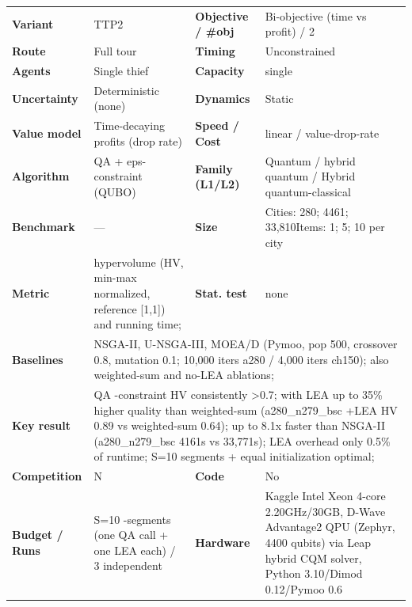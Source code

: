 \documentclass[
  a4paper,
  11pt,
  headings=small,
  numbers=noenddot,
  abstract=on,
  parskip=half,
]{scrartcl}
\begin{document}
\begin{landscape}
\begin{longtable}{@{}p{2.6cm}p{8.7cm}p{2.6cm}p{8.7cm}@{}}
\textbf{Variant} & TTP2 & \textbf{Objective / \#obj} & Bi-objective (time vs profit) / 2 \\
\textbf{Route} & Full tour & \textbf{Timing} & Unconstrained \\
\textbf{Agents} & Single thief & \textbf{Capacity} & single \\
\textbf{Uncertainty} & Deterministic (none) & \textbf{Dynamics} & Static \\
\textbf{Value model} & Time-decaying profits (drop rate) & \textbf{Speed / Cost} & linear / value-drop-rate \\
\textbf{Algorithm} & QA + eps-constraint (QUBO) & \textbf{Family (L1/L2)} & Quantum / hybrid quantum / Hybrid quantum-classical \\
\textbf{Benchmark} & --- & \textbf{Size} & Cities: 280; 4461; 33,810\newline Items: 1; 5; 10 per city \\
\textbf{Metric} & hypervolume (HV, min-max normalized, reference [1,1]) and running time; & \textbf{Stat. test} & none \\
\textbf{Baselines} & \multicolumn{3}{p{20.0cm}}{NSGA-II, U-NSGA-III, MOEA/D (Pymoo, pop 500, crossover 0.8, mutation 0.1; 10,000 iters a280 / 4,000 iters ch150); also weighted-sum and no-LEA ablations;} \\
\textbf{Key result} & \multicolumn{3}{p{20.0cm}}{QA -constraint HV consistently >0.7; with LEA up to 35\% higher quality than weighted-sum (a280\_n279\_bsc +LEA HV 0.89 vs weighted-sum 0.64); up to 8.1x faster than NSGA-II (a280\_n279\_bsc 4161s vs 33,771s); LEA overhead only 0.5\% of runtime; S=10 segments + equal initialization optimal;} \\
\textbf{Competition} & N & \textbf{Code} & No \\
\textbf{Budget / Runs} & S=10 -segments (one QA call + one LEA each) / 3 independent & \textbf{Hardware} & Kaggle Intel Xeon 4-core 2.20GHz/30GB, D-Wave Advantage2 QPU (Zephyr, 4400 qubits) via Leap hybrid CQM solver, Python 3.10/Dimod 0.12/Pymoo 0.6 \\

\end{longtable}
\end{landscape}
\end{document}
